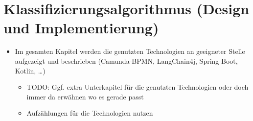 \chapter{Klassifizierungsalgorithmus (Design und Implementierung)}\label{ch:klassifizierungsalgorithmus-(design-und-implementierung)}

\begin{itemize}
    \item Im gesamten Kapitel werden die genutzten Technologien an geeigneter Stelle aufgezeigt und beschrieben (Camunda-BPMN, LangChain4j, Spring Boot, Kotlin, \ldots)
    \begin{itemize}
        \item TODO: Ggf. extra Unterkapitel für die genutzten Technologien oder doch immer da erwähnen wo es gerade passt
        \item Aufzählungen für die Technologien nutzen
    \end{itemize}
\end{itemize}








